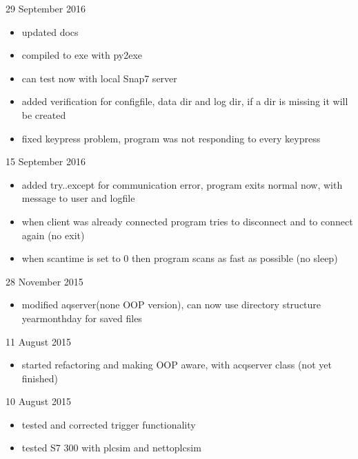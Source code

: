 \documentclass[a4paper,10pt,english]{sphinxmanual}
\begin{document}
29 September 2016
\begin{itemize}
\item {} 
updated docs

\item {} 
compiled to exe with py2exe

\item {} 
can test now with local Snap7 server

\item {} 
added verification for configfile, data dir and log dir, if a dir is missing it will be created

\item {} 
fixed keypress problem, program was not responding to every keypress

\end{itemize}

15 September 2016
\begin{itemize}
\item {} 
added try..except for communication error, program exits normal now, with message to user and logfile

\item {} 
when client was already connected program tries to disconnect and to connect again (no exit)

\item {} 
when scantime is set to 0 then program scans as fast as possible (no sleep)

\end{itemize}

28 November 2015
\begin{itemize}
\item {} 
modified aqserver(none OOP version), can now use directory structure yearmonthday  for saved files

\end{itemize}

11 August 2015
\begin{itemize}
\item {} 
started refactoring and making OOP aware, with acqserver class (not yet finished)

\end{itemize}

10 August 2015
\begin{itemize}
\item {} 
tested and corrected trigger functionality

\item {} 
tested S7 300 with plcsim and nettoplcsim

\end{itemize}
\end{document}
